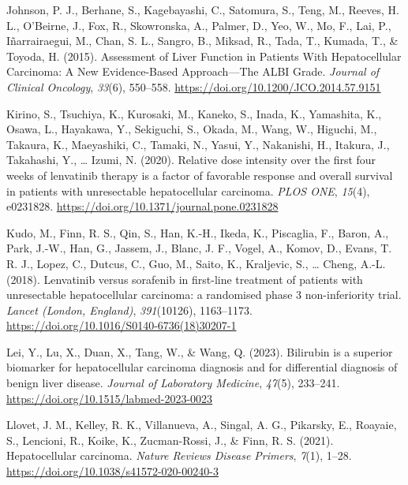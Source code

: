 \documentclass[
  indonesian,
]{report}
\newlength{\cslhangindent}
\newenvironment{CSLReferences}[2] %
 {\begin{list}{}{%
  \setlength{\itemindent}{0pt}
  \setlength{\leftmargin}{0pt}
  \setlength{\parsep}{0pt}
  \ifodd #1
   \setlength{\leftmargin}{\cslhangindent}
   \setlength{\itemindent}{-1\cslhangindent}
  \fi
  \setlength{\itemsep}{#2\baselineskip}}}
 {\end{list}}
\begin{document}
\begin{CSLReferences}{1}{0}
Johnson, P. J., Berhane, S., Kagebayashi, C., Satomura, S., Teng, M.,
Reeves, H. L., O'Beirne, J., Fox, R., Skowronska, A., Palmer, D., Yeo,
W., Mo, F., Lai, P., Iñarrairaegui, M., Chan, S. L., Sangro, B., Miksad,
R., Tada, T., Kumada, T., \& Toyoda, H. (2015). Assessment of {Liver}
{Function} in {Patients} {With} {Hepatocellular} {Carcinoma}: {A} {New}
{Evidence}-{Based} {Approach}---{The} {ALBI} {Grade}. \emph{Journal of
Clinical Oncology}, \emph{33}(6), 550--558.
\url{https://doi.org/10.1200/JCO.2014.57.9151}

Kirino, S., Tsuchiya, K., Kurosaki, M., Kaneko, S., Inada, K.,
Yamashita, K., Osawa, L., Hayakawa, Y., Sekiguchi, S., Okada, M., Wang,
W., Higuchi, M., Takaura, K., Maeyashiki, C., Tamaki, N., Yasui, Y.,
Nakanishi, H., Itakura, J., Takahashi, Y., \ldots{} Izumi, N. (2020).
Relative dose intensity over the first four weeks of lenvatinib therapy
is a factor of favorable response and overall survival in patients with
unresectable hepatocellular carcinoma. \emph{PLOS ONE}, \emph{15}(4),
e0231828. \url{https://doi.org/10.1371/journal.pone.0231828}

Kudo, M., Finn, R. S., Qin, S., Han, K.-H., Ikeda, K., Piscaglia, F.,
Baron, A., Park, J.-W., Han, G., Jassem, J., Blanc, J. F., Vogel, A.,
Komov, D., Evans, T. R. J., Lopez, C., Dutcus, C., Guo, M., Saito, K.,
Kraljevic, S., \ldots{} Cheng, A.-L. (2018). Lenvatinib versus sorafenib
in first-line treatment of patients with unresectable hepatocellular
carcinoma: a randomised phase 3 non-inferiority trial. \emph{Lancet
(London, England)}, \emph{391}(10126), 1163--1173.
\url{https://doi.org/10.1016/S0140-6736(18)30207-1}

Lei, Y., Lu, X., Duan, X., Tang, W., \& Wang, Q. (2023). Bilirubin is a
superior biomarker for hepatocellular carcinoma diagnosis and for
differential diagnosis of benign liver disease. \emph{Journal of
Laboratory Medicine}, \emph{47}(5), 233--241.
\url{https://doi.org/10.1515/labmed-2023-0023}

Llovet, J. M., Kelley, R. K., Villanueva, A., Singal, A. G., Pikarsky,
E., Roayaie, S., Lencioni, R., Koike, K., Zucman-Rossi, J., \& Finn, R.
S. (2021). Hepatocellular carcinoma. \emph{Nature Reviews Disease
Primers}, \emph{7}(1), 1--28.
\url{https://doi.org/10.1038/s41572-020-00240-3}


\end{CSLReferences}
\end{document}
